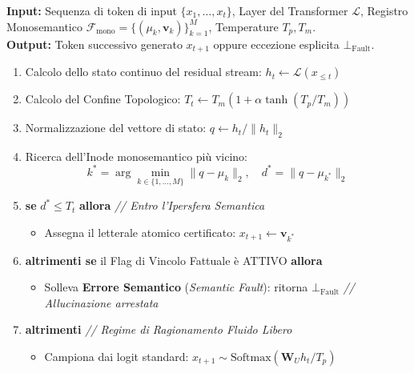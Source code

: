 \documentclass[11pt,a4paper]{article}
\theoremstyle{definition}
\begin{document}
\begin{tcolorbox}[title={\small \textbf{Algoritmo 1: Esecuzione Forward e Verifica Metrica in HySA}}]
\small
\textbf{Input:} Sequenza di token di input $\{x_1, \dots, x_t\}$, Layer del Transformer $\mathcal{L}$, Registro Monosemantico $\mathcal{F}_{\mathrm{mono}} = \{(\mu_k, \mathbf{v}_k)\}_{k=1}^M$, Temperature $T_p, T_m$. \\
\textbf{Output:} Token successivo generato $x_{t+1}$ oppure eccezione esplicita $\bot_{\mathrm{Fault}}$.
\begin{enumerate}[leftmargin=*, itemsep=2.0pt, topsep=2.0pt]
    \item Calcolo dello stato continuo del residual stream: $h_t \leftarrow \mathcal{L}(x_{\le t})$
    \item Calcolo del Confine Topologico: $T_t \leftarrow T_m \left( 1 + \alpha \tanh(T_p / T_m) \right)$
    \item Normalizzazione del vettore di stato: $q \leftarrow h_t / \|h_t\|_2$
    \item Ricerca dell'Inode monosemantico più vicino:
    \[
    k^* = \arg\min_{k \in \{1, \dots, M\}} \|q - \mu_k\|_2, \quad d^* = \|q - \mu_{k^*}\|_2
    \]
    \item \textbf{se} $d^* \le T_t$ \textbf{allora} \hfill \textit{// Entro l'Ipersfera Semantica}
    \begin{itemize}[leftmargin=14pt, itemsep=1.0pt]
        \item Assegna il letterale atomico certificato: $x_{t+1} \leftarrow \mathbf{v}_{k^*}$
    \end{itemize}
    \item \textbf{altrimenti se} il Flag di Vincolo Fattuale è ATTIVO \textbf{allora}
    \begin{itemize}[leftmargin=14pt, itemsep=1.0pt]
        \item Solleva \textbf{Errore Semantico} (\textit{Semantic Fault}): ritorna $\bot_{\mathrm{Fault}}$ \hfill \textit{// Allucinazione arrestata}
    \end{itemize}
    \item \textbf{altrimenti} \hfill \textit{// Regime di Ragionamento Fluido Libero}
    \begin{itemize}[leftmargin=14pt, itemsep=1.0pt]
        \item Campiona dai logit standard: $x_{t+1} \sim \mathrm{Softmax}(\mathbf{W}_U h_t / T_p)$
    \end{itemize}
\end{enumerate}
\end{tcolorbox}
\end{document}
